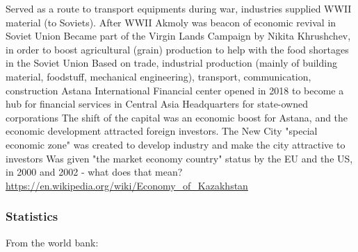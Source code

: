 \documentclass{article}
\begin{document}
\begin{outline}
  \1 Served as a route to transport equipments during war, industries supplied WWII material (to Soviets). After WWII Akmoly was beacon of economic revival in Soviet Union
  \1 Became part of the Virgin Lands Campaign by Nikita Khrushchev, in order to boost agricultural (grain) production to help with the food shortages in the Soviet Union
  \1 Based on trade, industrial production (mainly of building material, foodstuff, mechanical engineering), transport, communication, construction
  \1 Astana International Financial center opened in 2018 to become a hub for financial services in Central Asia
  \1 Headquarters for state-owned corporations
  \1 The shift of the capital was an economic boost for Astana, and the economic development attracted foreign investors. The New City "special economic zone" was created to develop industry and make the city attractive to investors
  	\1 Was given "the market economy country" status by the EU and the US, in 2000 and 2002 - what does that mean? \url{https://en.wikipedia.org/wiki/Economy_of_Kazakhstan}
\end{outline}

\subsubsection{Statistics}

From the world bank:
\end{document}
